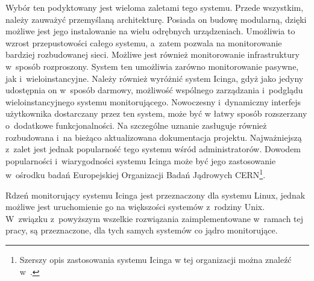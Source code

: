 Wybór ten podyktowany jest wieloma zaletami tego systemu. Przede
wszystkim, należy zauważyć przemyślaną architekturę. Posiada on budowę
modularną, dzięki możliwe jest jego instalowanie na wielu odrębnych
urządzeniach. Umożliwia to wzrost przepustowości całego systemu,
a~zatem pozwala na monitorowanie bardziej rozbudowanej sieci. Możliwe
jest również monitorowanie infrastruktury w~sposób rozproszony. System
ten umożliwia zarówno monitorowanie pasywne, jak
i~wieloinstancyjne. Należy również wyróżnić system Icinga, gdyż jako
jedyny udostępnia on w~sposób darmowy, możliwość wspólnego zarządzania
i~podglądu wieloinstancyjnego systemu monitorującego. Nowoczesny
i~dynamiczny interfejs użytkownika dostarczany przez ten system, może
być w łatwy sposób rozszerzany o~dodatkowe funkcjonalności. Na
szczególne uznanie zasługuje również rozbudowana i~na bieżąco
aktualizowana dokumentacja projektu. Najważniejszą z~zalet jest jednak
popularność tego systemu wśród administratorów. Dowodem popularności
i~wiarygodności systemu Icinga może być jego zastosowanie w~ośrodku
badań Europejskiej Organizacji Badań Jądrowych CERN\footnote{Szerszy
  opis zastosowania systemu Icinga w tej organizacji można znaleźć
  w~\cite{www:IcingaCern}.}.

Rdzeń monitorujący systemu Icinga jest przeznaczony dla systemu Linux,
jednak możliwe jest uruchomienie go na większości systemów z~rodziny
Unix. W~związku z~powyższym wszelkie rozwiązania zaimplementowane
w~ramach tej pracy, są przeznaczone, dla tych samych systemów co
jądro monitorujące.
